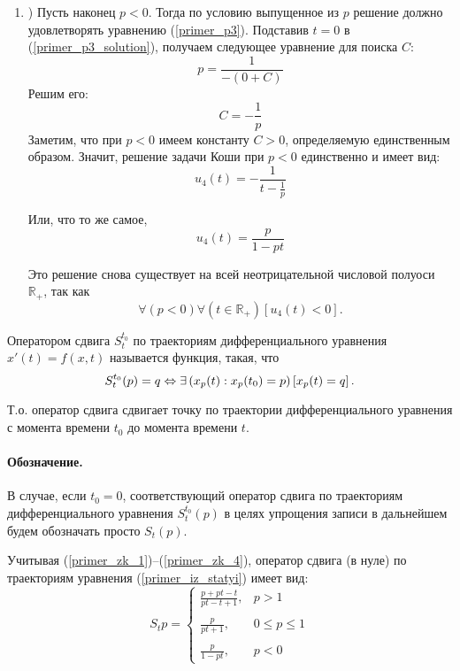 \begin{enumerate}
\item)
Пусть наконец $p<0$.
Тогда по условию выпущенное из $p$ решение должно удовлетворять уравнению (\ref{primer_p3}).
Подставив $t=0$ в (\ref{primer_p3_solution}), получаем следующее уравнение для поиска $C$:
$$
	p=\frac{1}{-(0+C)}
$$
Решим его:
$$
	C=-\frac{1}{p}
$$
Заметим, что при $p<0$ имеем константу $C>0$, определяемую единственным образом.
Значит, решение задачи Коши при $p<0$ единственно и имеет вид:
\begin{equation}\label{primer_zk_4_0}
	u_4(t)=-\frac{1}{t-\frac{1}{p}}
\end{equation}

Или, что то же самое,
\begin{equation}\label{primer_zk_4}
	u_4(t)=\frac{p}{1-pt}
\end{equation}

Это решение снова существует на всей неотрицательной числовой полуоси $\mathbb{R}_+$, так как
$$
	\forall(p<0)\forall\left(t \in \mathbb{R}_+\right)\left[u_4(t) < 0\right].
$$

\end{enumerate}

\opred
Оператором сдвига $S^{t_0}_t$ по траекториям дифференциального уравнения $x'(t) = f(x,t)$ называется функция, такая, что
\begin{equation*}
	S^{t_0}_t (p) = q \Leftrightarrow
		\exists\left(x_p(t) : x_p(t_0) = p\right)\left[x_p(t) = q\right].
\end{equation*}

Т.о. оператор сдвига сдвигает точку по траектории дифференциального уравнения с момента времени $t_0$ до момента времени $t$.

\paragraph{Обозначение.}
В случае, если $t_0=0$, соответствующий оператор сдвига по траекториям дифференциального уравнения $S^{t_0}_t (p)$ в целях упрощения записи  в дальнейшем будем обозначать просто $S_t (p)$.

Учитывая (\ref{primer_zk_1})--(\ref{primer_zk_4}), оператор сдвига (в нуле) по траекториям уравнения (\ref{primer_iz_statyi}) имеет вид:
\begin{equation}\label{oper_sdviga_primer_1}
	S_t p =
	\left\{
		\begin{array}{ll}
			\frac{p+pt-t}{pt-t+1}, & p > 1
		\\\\
			\frac{p}{pt+1},        & 0 \leq p \leq 1
		\\\\
			\frac{p}{1 - pt},      & p < 0
		\end{array}
	\right.
\end{equation}


